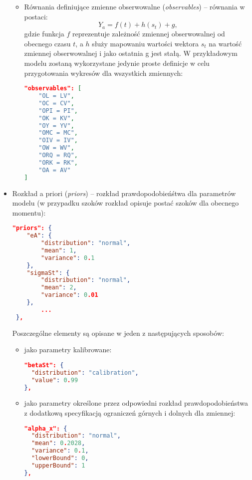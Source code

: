 \begin{itemize}
\begin{itemize}
            
            \item Równania definiujące zmienne obserwowalne (\emph{observables}) -- równania w postaci:
            \begin{equation}
                Y_{a} = f(t) + h(s_t) + g,
            \end{equation}
            gdzie funkcja $f$ reprezentuje zależność zmiennej obserwowalnej od obecnego czasu $t$, a $h$ służy mapowaniu wartości wektora $s_t$ na wartość zmiennej obserwowalnej i jako ostatnia g jest stałą. W przykładowym modelu zostaną wykorzystane jedynie proste definicje w celu przygotowania wykresów dla wszystkich zmiennych:
            \begin{lstlisting}[language=json,firstnumber=29]
"observables": [
    "OL = LV",
    "OC = CV",
    "OPI = PI",
    "OK = KV",
    "OY = YV",
    "OMC = MC",
    "OIV = IV",
    "OW = WV",
    "ORQ = RQ",
    "ORK = RK",
    "OA = AV"
]
            \end{lstlisting}
        \end{itemize}
    \item Rozkład a priori (\emph{priors}) -- rozkład prawdopodobieńśtwa dla parametrów modelu (w przypadku szoków rozkład opisuje postać szoków dla obecnego momentu):
    \begin{lstlisting}[language=json,firstnumber=43]
 "priors": {
    "eA": {
        "distribution": "normal",
        "mean": 1,
        "variance": 0.1
    },
    "sigmaSt": {
        "distribution": "normal",
        "mean": 2,
        "variance": 0.01
    },
        ...
 },
    \end{lstlisting}
    Poszczególne elementy są opisane w jeden z następujących sposobów:
    \begin{itemize}
        \item jako parametry kalibrowane:
            \begin{lstlisting}[language=json,firstnumber=43]
"betaSt": {
  "distribution": "calibration",
  "value": 0.99
},
            \end{lstlisting}
        \item jako parametry określone przez odpowiedni rozkład prawdopodobieństwa z dodatkową specyfikacją ograniczeń górnych i dolnych dla zmiennej:
            \begin{lstlisting}[language=json,firstnumber=43]
"alpha_x": {
  "distribution": "normal",
  "mean": 0.2028,
  "variance": 0.1,
  "lowerBound": 0,
  "upperBound": 1
},
            \end{lstlisting}        

\end{itemize}
\end{itemize}
